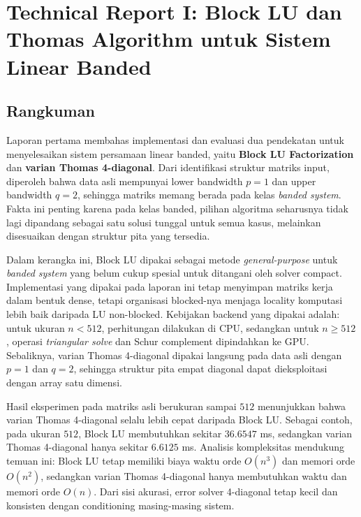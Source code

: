 \documentclass[12pt,a4paper]{article}
\begin{document}
\begin{titlepage}
\end{titlepage}

\clearpage
\tableofcontents
\clearpage

\section*{Technical Report I: Block LU dan Thomas Algorithm untuk Sistem Linear Banded}

\subsection*{Rangkuman}
Laporan pertama membahas implementasi dan evaluasi dua pendekatan untuk menyelesaikan sistem persamaan linear banded, yaitu \textbf{Block LU Factorization} dan \textbf{varian Thomas 4-diagonal}. Dari identifikasi struktur matriks input, diperoleh bahwa data asli mempunyai lower bandwidth $p=1$ dan upper bandwidth $q=2$, sehingga matriks memang berada pada kelas \emph{banded system}. Fakta ini penting karena pada kelas banded, pilihan algoritma seharusnya tidak lagi dipandang sebagai satu solusi tunggal untuk semua kasus, melainkan disesuaikan dengan struktur pita yang tersedia.

Dalam kerangka ini, Block LU dipakai sebagai metode \emph{general-purpose} untuk \emph{banded system} yang belum cukup spesial untuk ditangani oleh solver compact. Implementasi yang dipakai pada laporan ini tetap menyimpan matriks kerja dalam bentuk dense, tetapi organisasi blocked-nya menjaga locality komputasi lebih baik daripada LU non-blocked. Kebijakan backend yang dipakai adalah: untuk ukuran $n<512$, perhitungan dilakukan di CPU, sedangkan untuk $n\geq512$, operasi \emph{triangular solve} dan Schur complement dipindahkan ke GPU. Sebaliknya, varian Thomas 4-diagonal dipakai langsung pada data asli dengan $p=1$ dan $q=2$, sehingga struktur pita empat diagonal dapat dieksploitasi dengan array satu dimensi.

Hasil eksperimen pada matriks asli berukuran sampai $512$ menunjukkan bahwa varian Thomas 4-diagonal selalu lebih cepat daripada Block LU. Sebagai contoh, pada ukuran $512$, Block LU membutuhkan sekitar $36.6547$ ms, sedangkan varian Thomas 4-diagonal hanya sekitar $6.6125$ ms. Analisis kompleksitas mendukung temuan ini: Block LU tetap memiliki biaya waktu orde $O(n^3)$ dan memori orde $O(n^2)$, sedangkan varian Thomas 4-diagonal hanya membutuhkan waktu dan memori orde $O(n)$. Dari sisi akurasi, error solver 4-diagonal tetap kecil dan konsisten dengan conditioning masing-masing sistem.
\end{document}
